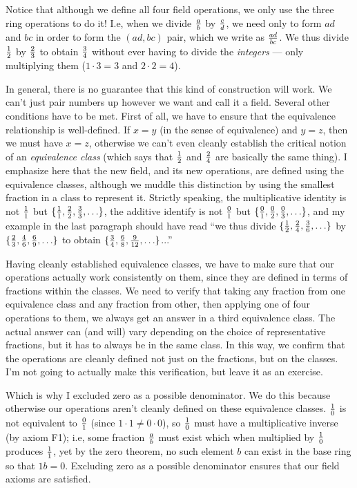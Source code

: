 Notice that although we define all four field operations, we only
use the three ring operations to do it!  I.e, when we divide
$a\over b$ by $c\over d$, we need only to form $ad$ and $bc$
in order to form the $(ad,bc)$ pair, which we write as ${ad}\over{bc}$.
We thus divide $1\over2$ by $2\over3$ to obtain $3\over4$
without ever having to divide the {\it integers} ---
only multiplying them ($1\cdot3=3$ and $2\cdot2=4$).

In general, there is no guarantee that this kind of construction will
work.  We can't just pair numbers up however we want and call it a
field.  Several other conditions have to be met.  First of all, we
have to ensure that the equivalence relationship is well-defined.  If
$x=y$ (in the sense of equivalence) and $y=z$, then we must have
$x=z$, otherwise we can't even cleanly establish the critical notion
of an {\it equivalence class} (which says that $1\over2$ and $2\over4$
are basically the same thing).  I emphasize here that the new field,
and its new operations, are defined using the equivalence classes,
although we muddle this distinction by using the smallest fraction in
a class to represent it.  Strictly speaking, the multiplicative
identity is not ${1\over1}$ but
$\{{1\over1},{2\over2},{3\over3},\ldots\}$, the additive identify is
not ${0\over1}$ but $\{{0\over1},{0\over2},{0\over3},\ldots\}$, and my
example in the last paragraph should have read ``we thus divide
$\{{1\over2},{2\over4},{3\over6},\ldots\}$ by
$\{{2\over3},{4\over6},{6\over9},\ldots\}$ to obtain
$\{{3\over4},{6\over8},{9\over12},\ldots\}$...''

Having cleanly established equivalence
classes, we have to make sure that our operations actually work
consistently on them, since they are defined in terms of fractions
within the classes.  We need to verify that taking any fraction from
one equivalence class and any fraction from other, then applying one
of four operations to them, we always get an answer in a third
equivalence class.  The actual answer can (and will) vary depending on
the choice of representative fractions, but it has to always be in the
same class.  In this way, we confirm that the operations are cleanly
defined not just on the fractions, but on the classes.  I'm not going
to actually make this verification, but leave it as an exercise.

Which is why I excluded zero as a possible denominator.  We do this
because otherwise our operations aren't cleanly defined on these
equivalence classes. ${1\over0}$ is not equivalent to ${0\over1}$
(since $1\cdot1\ne0\cdot0$), so ${1\over0}$ must have a multiplicative
inverse (by axiom F1); i.e, some fraction ${a\over b}$ must exist
which when multiplied by ${1\over0}$ produces ${1\over1}$, yet by the
zero theorem, no such element $b$ can exist in the base ring so that
$1b=0$.  Excluding zero as a possible denominator ensures that our
field axioms are satisfied.

